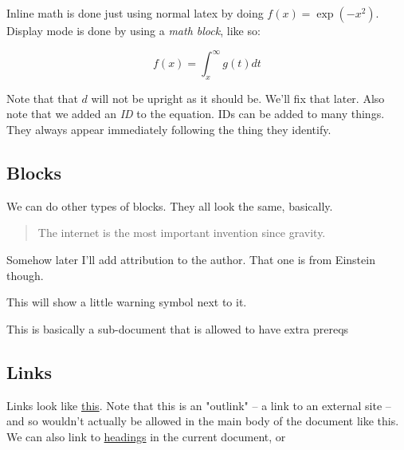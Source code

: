 \message{ !name(target.tex)}\documentclass[12pt]{article}
\begin{document}
Inline math is done just using normal latex by doing  $f(x) = \exp
(-x^2)$.  Display mode is done by using a \emph{math block}, like so:


\label{eqn:f-defn}\begin{displaymath}
f(x) = \int_x^\infty g(t) dt
\end{displaymath}

Note that that  $d$ will not be upright as it should be.  We'll fix
that later.  Also note that we added an \emph{ID} to the equation.  IDs can
be added to many things.  They always appear immediately following the
thing they identify.

\subsection{Blocks}


We can do other types of blocks.  They all look the same, basically.


\begin{quote}
The internet is the most important invention since gravity.
\end{quote}

Somehow later I'll add attribution to the author.  That one is from
Einstein though.


This will show a little warning symbol next to it.


This is basically a sub-document that is allowed to have extra prereqs

\subsection{Links}


Links look like \href{https://learn.independentlearning.science/https://www.google.com}{this}.  Note that this is
an "outlink" -- a link to an external site -- and so wouldn't actually
be allowed in the main body of the document like this.  We can also
link to \href{Blocks}{headings} in the current document, or

\end{document}
